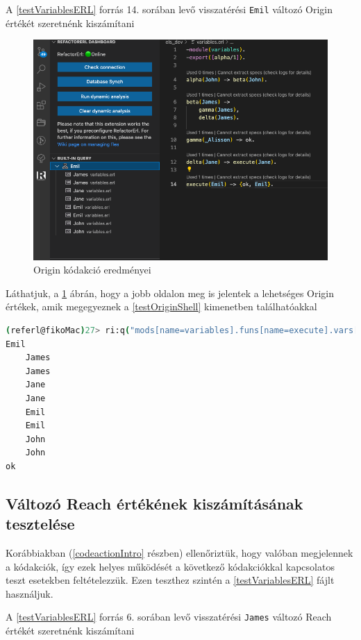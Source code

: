 A \ref{testVariablesERL} forrás 14. sorában levő visszatérési \lstinline{Emil} változó Origin értékét szeretnénk kiszámítani


\begin{figure}[H]
  \centering
  \includegraphics[width=0.9\linewidth]{images/testCases/testVarOr.png}
  \caption{Origin kódakció eredményei}
  \label{fig:testVarOr}
\end{figure}


Láthatjuk, a \ref{fig:testVarOr} ábrán, hogy a jobb oldalon meg is jelentek a lehetséges Origin értékek, amik megegyeznek a \ref{testOriginShell} kimenetben találhatóakkal


\lstset{caption=Válltozó Origin értéke Shellből, label=testOriginShell}
\begin{lstlisting}[language={sh}]  
(referl@fikoMac)27> ri:q("mods[name=variables].funs[name=execute].vars[name=Emil].refs.origin").    
Emil
    James
    James
    Jane
    Jane
    Emil
    Emil
    John
    John
ok
\end{lstlisting}

\newpage

\subsection{Változó Reach értékének kiszámításának tesztelése}


Korábbiakban (\ref{codeactionIntro} részben) ellenőriztük, hogy valóban megjelennek a kódakciók, így ezek helyes működését a következő kódakciókkal kapcsolatos teszt esetekben feltételezzük. Ezen teszthez szintén a \ref{testVariablesERL} fájlt használjuk.
 

A \ref{testVariablesERL} forrás 6. sorában levő visszatérési \lstinline{James} változó Reach értékét szeretnénk kiszámítani


